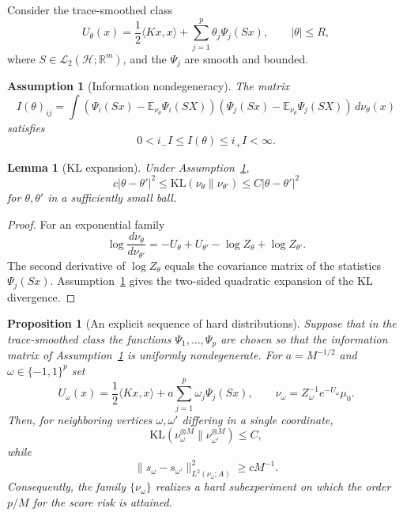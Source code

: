 \documentclass{article}
\newtheorem{lemma}[theorem]{Lemma}
\newtheorem{proposition}[theorem]{Proposition}
\newtheorem{assumption}[theorem]{Assumption}
\newcommand{\Hh}{\mathcal H}
\newcommand{\LLtwo}{\mathcal L_2}
\newcommand{\E}{\mathbb E}
\begin{document}
Consider the trace-smoothed class
\[
        U_\theta(x)=\frac12\langle Kx,x\rangle+
        \sum_{j=1}^p\theta_j\Psi_j(Sx),
        \qquad |\theta|\le R,
\]
where \(S\in\LLtwo(\Hh;\mathbb R^m)\), and the \(\Psi_j\) are smooth and bounded.

\begin{assumption}[Information nondegeneracy]
\label{ass:info}
The matrix
\[
        I(\theta)_{ij}
        =
        \int
        \left(\Psi_i(Sx)-\E_{\nu_\theta}\Psi_i(SX)\right)
        \left(\Psi_j(Sx)-\E_{\nu_\theta}\Psi_j(SX)\right)
        \,d\nu_\theta(x)
\]
satisfies
\[
        0<i_-I\le I(\theta)\le i_+I<\infty .
\]
\end{assumption}

\begin{lemma}[KL expansion]
\label{lem:kl}
Under Assumption~\ref{ass:info},
\[
        c|\theta-\theta'|^2
        \le
        \mathrm{KL}(\nu_\theta\|\nu_{\theta'})
        \le
        C|\theta-\theta'|^2
\]
for \(\theta,\theta'\) in a sufficiently small ball.
\end{lemma}

\begin{proof}
For an exponential family
\[
        \log\frac{d\nu_\theta}{d\nu_{\theta'}}
        =
        -U_\theta+U_{\theta'}-\log Z_\theta+\log Z_{\theta'}.
\]
The second derivative of \(\log Z_\theta\) equals the covariance matrix of the
statistics \(\Psi_j(Sx)\). Assumption~\ref{ass:info} gives the two-sided
quadratic expansion of the KL divergence.
\end{proof}


\begin{proposition}[An explicit sequence of hard distributions]
\label{prop:hard-distributions}
Suppose that in the trace-smoothed class the functions \(\Psi_1,\dots,\Psi_p\)
are chosen so that the information matrix of Assumption~\ref{ass:info} is
uniformly nondegenerate. For \(a=M^{-1/2}\) and \(\omega\in\{-1,1\}^p\) set
\[
        U_\omega(x)
        =
        \frac12\langle Kx,x\rangle+
        a\sum_{j=1}^p\omega_j\Psi_j(Sx),
        \qquad
        \nu_\omega=Z_\omega^{-1}e^{-U_\omega}\mu_0 .
\]
Then, for neighboring vertices \(\omega,\omega'\) differing in a single
coordinate,
\[
        \mathrm{KL}(\nu_\omega^{\otimes M}\|\nu_{\omega'}^{\otimes M})
        \le C,
\]
while
\[
        \|s_\omega-s_{\omega'}\|_{L^2(\nu_\omega;A)}^2
        \ge cM^{-1}.
\]
Consequently, the family \(\{\nu_\omega\}\) realizes a hard subexperiment on which
the order \(p/M\) for the score risk is attained.
\end{proposition}
\end{document}
